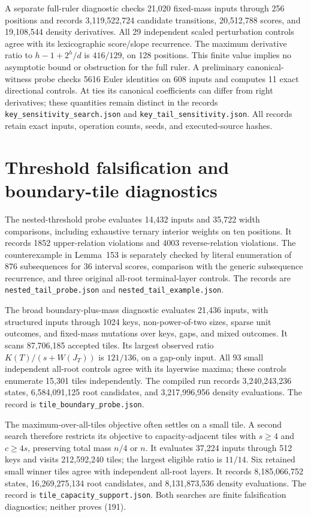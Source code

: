 \documentclass[11pt]{article}
\begin{document}
A separate full-ruler diagnostic checks 21,020 fixed-mass inputs through
256 positions and records 3,119,522,724 candidate transitions, 20,512,788
scores, and 19,108,544 density derivatives. All 29 independent scaled
perturbation controls agree with its lexicographic score/slope recurrence.
The maximum derivative ratio to $h-1+2^h/d$ is $416/129$, on 128
positions. This finite value implies no asymptotic bound or obstruction
for the full ruler. A preliminary canonical-witness probe checks 5616
Euler identities on 608 inputs and computes 11 exact directional controls.
At ties its canonical coefficients can differ from right derivatives;
these quantities remain distinct in the records
\texttt{key\_sensitivity\_search.json} and
\texttt{key\_tail\_sensitivity.json}. All records retain exact inputs,
operation counts, seeds, and executed-source hashes.

\section{Threshold falsification and boundary-tile diagnostics}
\label{app:boundary-tile-target}
The nested-threshold probe evaluates 14,432 inputs and 35,722 width
comparisons, including exhaustive ternary interior weights on ten positions.
It records 1852 upper-relation violations and 4003 reverse-relation
violations. The counterexample in Lemma~153
is separately checked by literal enumeration of 876 subsequences for
36 interval scores, comparison with the generic subsequence recurrence,
and three original all-root terminal-layer controls. The records are
\texttt{nested\_tail\_probe.json} and
\texttt{nested\_tail\_example.json}.

The broad boundary-plus-mass diagnostic evaluates 21,436 inputs, with
structured inputs through 1024 keys, non-power-of-two sizes, sparse unit
outcomes, and fixed-mass mutations over keys, gaps, and mixed outcomes.
It scans 87,706,185 accepted tiles. Its largest observed ratio
$K(T)/(s+W(J_T))$ is $121/136$, on a gap-only input. All 93 small
independent all-root controls agree with its layerwise maxima; these
controls enumerate 15,301 tiles independently. The compiled run records
3,240,243,236 states, 6,584,091,125 root candidates, and 3,217,996,956
density evaluations. The record is \texttt{tile\_boundary\_probe.json}.

The maximum-over-all-tiles objective often settles on a small tile.
A second search therefore restricts its objective to capacity-adjacent
tiles with $s\ge4$ and $c\ge4s$, preserving total mass $n/4$ or $n$.
It evaluates 37,224 inputs through 512 keys and visits 212,592,240 tiles;
the largest eligible ratio is $11/14$. Six retained small winner tiles
agree with independent all-root layers. It records 8,185,066,752 states,
16,269,275,134 root candidates, and 8,131,873,536 density evaluations.
The record is \texttt{tile\_capacity\_support.json}. Both searches are
finite falsification diagnostics; neither proves
(191).
\end{document}
